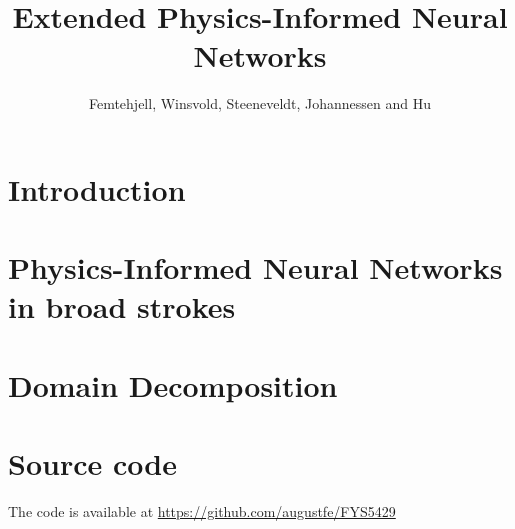 \documentclass[aps,rmp,reprint,amsmath,amssymb,graphicx,longbibliography]{revtex4-1}
\begin{document}

\title{Extended Physics-Informed Neural Networks}

\author{Femtehjell, Winsvold, Steeneveldt, Johannessen and Hu}


\begin{abstract}
    \lipsum[1-1] 
\end{abstract}

\maketitle

\tableofcontents


\section{Introduction} 
\label{sec:introduction}
\cite[p.~69--420]{Goodfellow2016}

\section{Physics-Informed Neural Networks in broad strokes}
\lipsum[5-6]

\section{Domain Decomposition}
\lipsum[6-7]


\appendix
\section{Source code}
The code is available at \url{https://github.com/augustfe/FYS5429}
\end{document}
